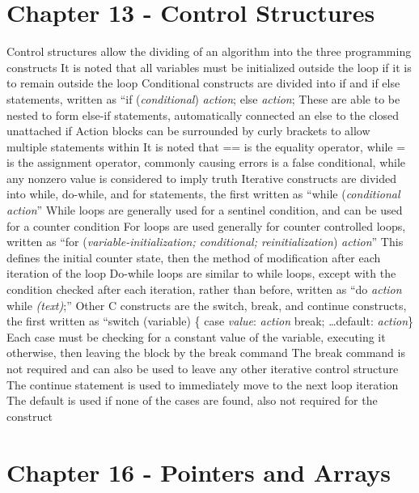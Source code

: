 \documentclass[11 pt, twoside]{article}
\newenvironment{outline*}
{
	\begin{outline}[enumerate]
	}
	{\end{outline}
}
\begin{document}
\section{Chapter 13 - Control Structures}
\begin{outline*}
\1 Control structures allow the dividing of an algorithm into the three programming constructs
\2 It is noted that all variables must be initialized outside the loop if it is to remain outside the loop
\1 Conditional constructs are divided into if and if else statements, written as ``if (\textit{conditional}) \textit{action}; else \textit{action};
\2 These are able to be nested to form else-if statements, automatically connected an else to the closed unattached if
\2 Action blocks can be surrounded by curly brackets to allow multiple statements within
\2 It is noted that == is the equality operator, while = is the assignment operator, commonly causing errors
 is a false conditional, while any nonzero value is considered to imply truth
\1 Iterative constructs are divided into while, do-while, and for statements, the first written as ``while (\textit{conditional} \textit{action}''
\2 While loops are generally used for a sentinel condition, and can be used for a counter condition
\2 For loops are used generally for counter controlled loops, written as ``for (\textit{variable-initialization; conditional; reinitialization}) \textit{action}''
\3 This defines the initial counter state, then the method of modification after each iteration of the loop
\2 Do-while loops are similar to while loops, except with the condition checked after each iteration, rather than before, written as ``do \textit{action} while \textit{(text)};''
\1 Other C constructs are the switch, break, and continue constructs, the first written as ``switch (variable) \{ case \textit{value}: \textit{action} break; \dots default: \textit{action}\}
\2 Each case must be checking for a constant value of the variable, executing it otherwise, then leaving the block by the break command
\2 The break command is not required and can also be used to leave any other iterative control structure
\3 The continue statement is used to immediately move to the next loop iteration
\2 The default is used if none of the cases are found, also not required for the construct
\end{outline*}
\section{Chapter 16 - Pointers and Arrays}
\begin{outline*}

\end{outline*}
\end{document}
